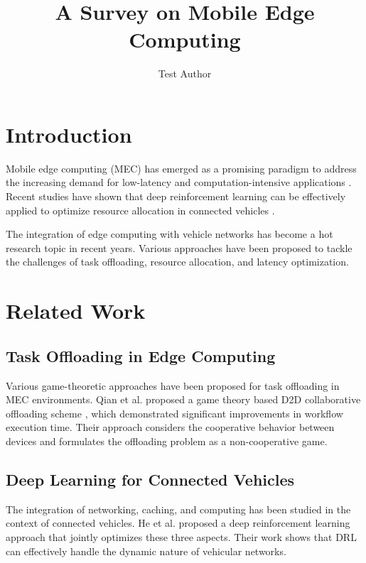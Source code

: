 \documentclass{article}
\begin{document}
\title{A Survey on Mobile Edge Computing}
\author{Test Author}
\maketitle

\section{Introduction}

Mobile edge computing (MEC) has emerged as a promising paradigm to address the increasing demand for low-latency and computation-intensive applications \cite{qian2022game}. Recent studies have shown that deep reinforcement learning can be effectively applied to optimize resource allocation in connected vehicles \cite{he2017integrated}.

The integration of edge computing with vehicle networks has become a hot research topic in recent years. Various approaches have been proposed to tackle the challenges of task offloading, resource allocation, and latency optimization.

\section{Related Work}

\subsection{Task Offloading in Edge Computing}

Various game-theoretic approaches have been proposed for task offloading in MEC environments. Qian et al. proposed a game theory based D2D collaborative offloading scheme \cite{qian2022game}, which demonstrated significant improvements in workflow execution time. Their approach considers the cooperative behavior between devices and formulates the offloading problem as a non-cooperative game.

\subsection{Deep Learning for Connected Vehicles}

The integration of networking, caching, and computing has been studied in the context of connected vehicles. He et al. \cite{he2017integrated} proposed a deep reinforcement learning approach that jointly optimizes these three aspects. Their work shows that DRL can effectively handle the dynamic nature of vehicular networks.
\end{document}
